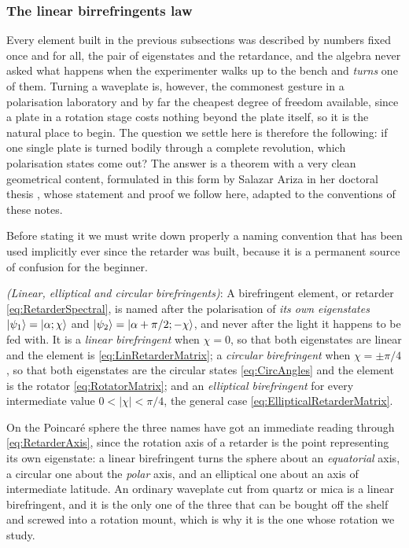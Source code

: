         \subsubsection{The linear birrefringents law}

            Every element built in the previous subsections was described by numbers fixed once and for all, the pair of eigenstates and the retardance, and the algebra never asked what happens when the experimenter walks up to the bench and \textit{turns} one of them. Turning a waveplate is, however, the commonest gesture in a polarisation laboratory and by far the cheapest degree of freedom available, since a plate in a rotation stage costs nothing beyond the plate itself, so it is the natural place to begin. The question we settle here is therefore the following: if one single plate is turned bodily through a complete revolution, which polarisation states come out? The answer is a theorem with a very clean geometrical content, formulated in this form by Salazar Ariza in her doctoral thesis \citep{salazar2021dinamica}, whose statement and proof we follow here, adapted to the conventions of these notes.

            Before stating it we must write down properly a naming convention that has been used implicitly ever since the retarder was built, because it is a permanent source of confusion for the beginner.

            \begin{myDef}
                \textit{(Linear, elliptical and circular birefringents)}: A birefringent element, or retarder \ref{eq:RetarderSpectral}, is named after the polarisation of \textit{its own eigenstates} $\ket{\psi_1}=\ket{\alpha;\chi}$ and $\ket{\psi_2}=\ket{\alpha+\pi/2;-\chi}$, and never after the light it happens to be fed with. It is a \emph{linear birefringent} when $\chi=0$, so that both eigenstates are linear and the element is \ref{eq:LinRetarderMatrix}; a \emph{circular birefringent} when $\chi=\pm\pi/4$, so that both eigenstates are the circular states \ref{eq:CircAngles} and the element is the rotator \ref{eq:RotatorMatrix}; and an \emph{elliptical birefringent} for every intermediate value $0<\left|\chi\right|<\pi/4$, the general case \ref{eq:EllipticalRetarderMatrix}.
            \end{myDef}

            On the Poincaré sphere the three names have got an immediate reading through \ref{eq:RetarderAxis}, since the rotation axis of a retarder is the point representing its own eigenstate: a linear birefringent turns the sphere about an \textit{equatorial} axis, a circular one about the \textit{polar} axis, and an elliptical one about an axis of intermediate latitude. An ordinary waveplate cut from quartz or mica is a linear birefringent, and it is the only one of the three that can be bought off the shelf and screwed into a rotation mount, which is why it is the one whose rotation we study.

